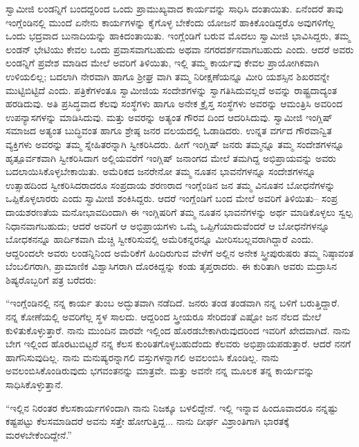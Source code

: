 ಸ್ವಾಮೀಜಿ ಲಂಡನ್ನಿಗೆ ಬಂದದ್ದರಿಂದ ಒಂದು ಪ್ರಾಮುಖ್ಯವಾದ ಕಾರ್ಯವನ್ನು ಸಾಧಿಸಿ ದಂತಾಯಿತು. ಏನೆಂದರೆ ತಾವು ಇಂಗ್ಲೆಂಡಿನಲ್ಲಿ ಮುಂದೆ ಏನೇನು ಕಾರ್ಯಗಳನ್ನು ಕೈಗೊಳ್ಳ ಬೇಕೆಂದು ಯೋಜನೆ ಹಾಕಿಕೊಂಡಿದ್ದರೊ ಅವುಗಳಿಗೆಲ್ಲ ಒಂದು ಭದ್ರವಾದ ಬುನಾದಿಯನ್ನು ಹಾಕಿದಂತಾಯಿತು. ಇಂಗ್ಲೆಂಡಿಗೆ ಬರುವ ಮೊದಲು ಸ್ವಾಮೀಜಿ ಭಾವಿಸಿದ್ದರು, ತಮ್ಮ ಲಂಡನ್ ಭೇಟಿಯು ಕೇವಲ ಒಂದು ಪ್ರವಾಸವಾಗಬಹುದು ಅಥವಾ ನಗರದರ್ಶನವಾಗಬಹುದು ಎಂದು. ಆದರೆ ಅವರು ಲಂಡನ್ನಿಗೆ ಪ್ರವೇಶ ಮಾಡಿದ ಮೇಲೆ ಅವರಿಗೆ ತಿಳಿಯಿತು, ಇಲ್ಲಿ ತಮ್ಮ ಕಾರ್ಯವು ಕೇವಲ ಪ್ರಾಯೋಗಿಕವಾಗಿ ಉಳಿಯಲಿಲ್ಲ; ಬದಲಾಗಿ ನೇರವಾಗಿ ಹಾಗೂ ಶ್ರೀಘ್ರ ವಾಗಿ ತಮ್ಮ ನಿರೀಕ್ಷಣೆಯನ್ನೂ ಮೀರಿ ಯಶಸ್ಸಿನ ಶಿಖರವನ್ನೇ ಮುಟ್ಟಿಬಿಟ್ಟಿದೆ ಎಂದು. ಪತ್ರಿಕೆಗಳಂತೂ ಸ್ವಾಮೀಜಿಯ ಸಂದೇಶಗಳನ್ನು ಸ್ವಾಗತಿಸಿದುವಲ್ಲದೆ ಅವನ್ನು ರಾಷ್ಟ್ರದಾದ್ಯಂತ ಹರಡಿದುವು. ಅತಿ ಪ್ರಸಿದ್ಧವಾದ ಕೆಲವು ಸಂಸ್ಥೆಗಳು ಹಾಗೂ ಅನೇಕ ಕ್ರೈಸ್ತ ಸಂಸ್ಥೆಗಳು ಅವರನ್ನು ಆಮಂತ್ರಿಸಿ ಅವರಿಂದ ಉಪನ್ಯಾಸಗಳನ್ನು ಮಾಡಿಸಿದುವು. ಮತ್ತು ಅವರನ್ನು ಅತ್ಯಂತ ಗೌರವ ದಿಂದ ಆದರಿಸಿದುವು. ಸ್ವಾಮೀಜಿ ಇಂಗ್ಲಿಷ್ ಸಮಾಜದ ಅತ್ಯಂತ ಬುದ್ಧಿವಂತ ಹಾಗೂ ಶ್ರೇಷ್ಠ ಜನರ ವಲಯದಲ್ಲಿ ಓಡಾಡಿದರು. ಉನ್ನತ ವರ್ಗದ ಗೌರವಾನ್ವಿತ ವ್ಯಕ್ತಿಗಳು ಅವರನ್ನು ತಮ್ಮ ಸ್ನೇಹಿತರನ್ನಾಗಿ ಸ್ವೀಕರಿಸಿದರು. ಹೀಗೆ ಇಂಗ್ಲಿಷ್ ಜನರು ತಮ್ಮನ್ನೂ ತಮ್ಮ ಸಂದೇಶಗಳನ್ನೂ ಹೃತ್ಪೂರ್ವಕವಾಗಿ ಸ್ವೀಕರಿಸಿದಾಗ ಅಲ್ಲಿಯವರೆಗೆ ಇಂಗ್ಲಿಷ್ ಜನಾಂಗದ ಮೇಲೆ ತಮಗಿದ್ದ ಅಭಿಪ್ರಾಯವನ್ನು ಅವರು ಬದಲಾಯಿಸಿಕೊಳ್ಳಬೇಕಾಯಿತು. ಅಮೆರಿಕದ ಜನರೇನೋ ತಮ್ಮ ನೂತನ ಭಾವನೆಗಳನ್ನೂ ಸಂದೇಶಗಳನ್ನೂ ಉತ್ಸಾಹದಿಂದ ಸ್ವೀಕರಿಸಿದರಾದರೂ ಸಂಪ್ರದಾಯ ಶರಣರಾದ ಇಂಗ್ಲೆಂಡಿನ ಜನ ತಮ್ಮ ವಿನೂತನ ಬೋಧನೆಗಳನ್ನು ಒಪ್ಪಿಕೊಳ್ಳಲಾರರು ಎಂದು ಸ್ವಾಮೀಜಿ ಶಂಕಿಸಿದ್ದರು. ಆದರೆ ಇಂಗ್ಲೆಂಡಿಗೆ ಬಂದ ಮೇಲೆ ಅವರಿಗೆ ತಿಳಿಯಿತು– ಸಂಪ್ರ ದಾಯಶರಣತೆಯ ಮನೋಭಾವದಿಂದಾಗಿ ಈ ಇಂಗ್ಲಿಷರಿಗೆ ತಮ್ಮ ನೂತನ ಭಾವನೆಗಳನ್ನು ಅರ್ಥ ಮಾಡಿಕೊಳ್ಳಲು ಸ್ವಲ್ಪ ನಿಧಾನವಾಗಬಹುದು; ಆದರೆ ಅವರಿಗೆ ಆ ಅಭಿಪ್ರಾಯಗಳು ಒಮ್ಮೆ ಒಪ್ಪಿಗೆಯಾದುವೆಂದರೆ ಆ ಬೋಧನೆಗಳನ್ನೂ ಬೋಧಕನನ್ನೂ ಹಾರ್ದಿಕವಾಗಿ ಮೆಚ್ಚಿ ಸ್ವೀಕರಿಸುವಲ್ಲಿ ಅಮೆರಿಕನ್ನರನ್ನೂ ಮೀರಿಸಬಲ್ಲವರಾಗಿದ್ದಾರೆ ಎಂದು. ಆದ್ದರಿಂದಲೇ ಅವರು ಲಂಡನ್ನಿನಿಂದ ಅಮೆರಿಕೆಗೆ ಹಿಂದಿರುಗುವ ವೇಳೆಗೆ ಅಲ್ಲಿನ ಅನೇಕ ಸ್ತ್ರೀಪುರುಷರು ತಮ್ಮ ನಿಷ್ಠಾವಂತ ಬೆಂಬಲಿಗರಾಗಿ, ಪ್ರಾಮಾಣಿಕ ವಿಶ್ವಾಸಿಗರಾಗಿ ದೊರಕಿದ್ದನ್ನು ಕಂಡು ತೃಪ್ತರಾದರು. ಈ ಕುರಿತಾಗಿ ಅವರು ಮದ್ರಾಸಿನ ಶಿಷ್ಯರೊಬ್ಬರಿಗೆ ಪತ್ರ ಬರೆದರು:

“ಇಂಗ್ಲೆಂಡಿನಲ್ಲಿ ನನ್ನ ಕಾರ್ಯ ತುಂಬ ಅದ್ಭುತವಾಗಿ ನಡೆದಿದೆ. ಜನರು ತಂಡ ತಂಡವಾಗಿ ನನ್ನ ಬಳಿಗೆ ಬರುತ್ತಿದ್ದಾರೆ. ನನ್ನ ಕೋಣೆಯಲ್ಲಿ ಅವರಿಗೆಲ್ಲ ಸ್ಥಳ ಸಾಲದು. ಆದ್ದರಿಂದ ಸ್ತ್ರೀಯರೂ ಸೇರಿದಂತೆ ಎಷ್ಟೋ ಜನ ನೆಲದ ಮೇಲೆ ಕುಳಿತುಕೊಳ್ಳುತ್ತಾರೆ. ನಾನು ಮುಂದಿನ ವಾರವೇ ಇಲ್ಲಿಂದ ಹೊರಡಬೇಕಾಗಿರುವುದರಿಂದ ಇವರಿಗೆ ಖೇದವಾಗಿದೆ. ನಾನು ಬೇಗ ಇಲ್ಲಿಂದ ಹೊರಟುಬಿಟ್ಟರೆ ನನ್ನ ಕೆಲಸ ಕುಂಠಿತಗೊಳ್ಳಬಹುದೆಂದು ಕೆಲವರು ಅಭಿಪ್ರಾಯಪಡುತ್ತಾರೆ. ಆದರೆ ನನಗೆ ಹಾಗೆನಿಸುವುದಿಲ್ಲ. ನಾನು ಮನುಷ್ಯರನ್ನಾಗಲಿ ವಸ್ತುಗಳನ್ನಾಗಲಿ ಅವಲಂಬಿಸಿ ಕೊಂಡಿಲ್ಲ. ನಾನು ಅವಲಂಬಿಸಿಕೊಂಡಿರುವುದು ಭಗವಂತನನ್ನು ಮಾತ್ರವೇ. ಮತ್ತು ಅವನೇ ನನ್ನ ಮೂಲಕ ತನ್ನ ಕಾರ್ಯವನ್ನು ಸಾಧಿಸಿಕೊಳ್ಳುತ್ತಾನೆ.

“ಇಲ್ಲಿನ ನಿರಂತರ ಕೆಲಸಕಾರ್ಯಗಳಿಂದಾಗಿ ನಾನು ನಿಜಕ್ಕೂ ಬಳಲಿದ್ದೇನೆ. ಇಲ್ಲಿ ಇನ್ನಾವ ಹಿಂದೂವಾದರೂ ನನ್ನಷ್ಟು ಕಷ್ಟಪಟ್ಟು ಕೆಲಸಮಾಡಿದರೆ ಅವನು ಸತ್ತೇ ಹೋಗುತ್ತಿದ್ದ... ನಾನು ದೀರ್ಘ ವಿಶ್ರಾಂತಿಗಾಗಿ ಭಾರತಕ್ಕೆ ಮರಳಬೇಕೆಂದಿದ್ದೇನೆ.”

